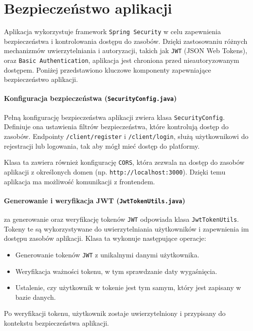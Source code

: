 \section{Bezpieczeństwo aplikacji}
Aplikacja wykorzystuje framework \texttt{Spring Security} w celu zapewnienia bezpieczeństwa i kontrolowania dostępu do zasobów. Dzięki zastosowaniu różnych mechanizmów uwierzytelniania i autoryzacji, takich jak \texttt{JWT} (JSON Web Tokens), oraz \texttt{Basic Authentication}, aplikacja jest chroniona przed nieautoryzowanym dostępem. Poniżej przedstawiono kluczowe komponenty zapewniające bezpieczeństwo aplikacji.

\paragraph{Konfiguracja bezpieczeństwa (\texttt{SecurityConfig.java})}  
Pełną konfigurację bezpieczeństwa aplikacji zwiera klasa \texttt{SecurityConfig}. Definiuje ona ustawienia filtrów bezpieczeństwa, które kontrolują dostęp do zasobów. Endpointy \texttt{/client/register} i \texttt{/client/login}, służą użytkownikowi do rejestracji lub logowania, tak aby mógł mieć dostęp do platformy. 

Klasa ta zawiera również konfigurację \texttt{CORS}, która zezwala na dostęp do zasobów aplikacji z określonych domen (np. \texttt{http://localhost:3000}). Dzięki temu aplikacja ma możliwość komunikacji z frontendem.

\paragraph{Generowanie i weryfikacja JWT (\texttt{JwtTokenUtils.java})} 
za generowanie oraz weryfikację tokenów \texttt{JWT} odpowiada klasa \texttt{JwtTokenUtils}. Tokeny te są wykorzystywane do uwierzytelniania użytkowników i zapewnienia im dostępu zasobów aplikacji. Klasa ta wykonuje następujące operacje:
\begin{itemize}
    \item Generowanie tokenów \texttt{JWT} z unikalnymi danymi użytkownika.
    \item Weryfikacja ważności tokenu, w tym sprawdzanie daty wygaśnięcia.
    \item Ustalenie, czy użytkownik w tokenie jest tym samym, który jest zapisany w bazie danych.
\end{itemize}
Po weryfikacji tokenu, użytkownik zostaje uwierzytelniony i przypisany do kontekstu bezpieczeństwa aplikacji.

